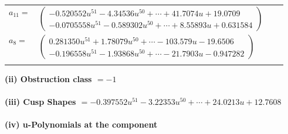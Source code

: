 \documentclass[1p]{elsarticle_modified}
\theoremstyle{definition}
\begin{document}
\begin{tabular}{m{7pt} m{180pt} m{7pt} m{180pt} }
\flushright $a_{11}=$&$\begin{pmatrix}-0.520552 u^{51}-4.34536 u^{50}+\cdots+41.7074 u+19.0709\\-0.0705558 u^{51}-0.589302 u^{50}+\cdots+8.55893 u+0.631584\end{pmatrix}$ \\
\flushright $a_{8}=$&$\begin{pmatrix}0.281350 u^{51}+1.78079 u^{50}+\cdots-103.579 u-19.6506\\-0.196558 u^{51}-1.93868 u^{50}+\cdots-21.7903 u-0.947282\end{pmatrix}$\\&\end{tabular}
\flushleft \textbf{(ii) Obstruction class $= -1$}\\~\\
\flushleft \textbf{(iii) Cusp Shapes $= -0.397552 u^{51}-3.22353 u^{50}+\cdots+24.0213 u+12.7608$}\\~\\
\newpage\renewcommand{\arraystretch}{1}
\flushleft \textbf{(iv) u-Polynomials at the component}\newline \\
\end{document}
